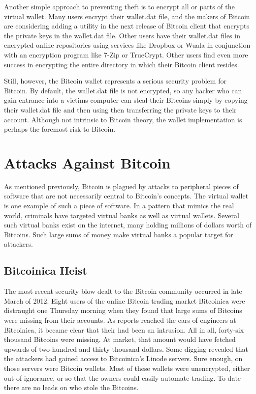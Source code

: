 \documentclass{report}
\begin{document}
Another simple approach to preventing theft is to encrypt all or parts of the virtual 
wallet.  Many users encrypt their wallet.dat file, and the makers of Bitcoin are considering 
adding a utility in the next release of Bitcoin client that encrypts the private keys 
in the wallet.dat file.  Other users have their wallet.dat files in encrypted online 
repositories using services like Dropbox or Wuala in conjunction with an encryption 
program like 7-Zip or TrueCrypt.  Other users find even more success in encrypting the 
entire directory in which their Bitcoin client resides.

Still, however, the Bitcoin wallet represents a serious security problem for Bitcoin.  
By default, the wallet.dat file is not encrypted, so any hacker who can gain entrance 
into a victims computer can steal their Bitcoins simply by copying their wallet.dat file 
and then using then transferring the private keys to their account.  Although not intrinsic 
to Bitcoin theory, the wallet implementation is perhaps the foremost risk to Bitcoin.

\section*{Attacks Against Bitcoin}
As mentioned previously, Bitcoin is plagued by attacks to peripheral pieces of software 
that are not necessarily central to Bitcoin's concepts.  The virtual wallet is one example
of such a piece of software.  In a pattern that mimics the real world, criminals have
targeted virtual banks as well as virtual wallets.  Several such virtual banks exist on
the internet, many holding millions of dollars worth of Bitcoins.  Such large sums of 
money make virtual banks a popular target for attackers.

\subsection*{Bitcoinica Heist}
The most recent security blow dealt to the Bitcoin community occurred in late March of
2012\cite{Goodin:Bitcoinica}.  Eight users of the online Bitcoin trading market Bitcoinica were distraught one
Thursday morning when they found that large sums of Bitcoins were missing from their 
accounts.  As reports reached the ears of engineers at Bitcoinica, it became clear that
their had been an intrusion.  All in all, forty-six thousand Bitcoins were missing.  At
market, that amount would have fetched upwards of two-hundred and thirty thousand dollars.
Some digging revealed that the attackers had gained access to Bitcoinica's Linode servers.
Sure enough, on those servers were Bitcoin wallets.  Most of these wallets were unencrypted,
either out of ignorance, or so that the owners could easily automate trading.  To date there
are no leads on who stole the Bitcoins.
\end{document}
